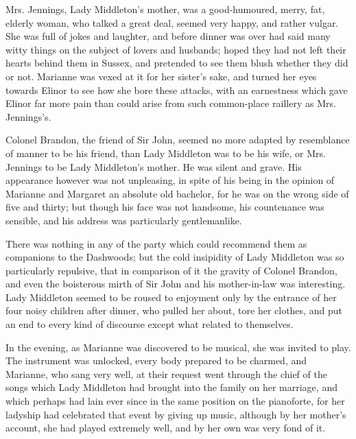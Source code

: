 Mrs. Jennings, Lady Middleton's mother, was a good-humoured, merry, fat, elderly woman, who talked a great deal, seemed very happy, and rather vulgar. She was full of jokes and laughter, and before dinner was over had said many witty things on the subject of lovers and husbands; hoped they had not left their hearts behind them in Sussex, and pretended to see them blush whether they did or not. Marianne was vexed at it for her sister's sake, and turned her eyes towards Elinor to see how she bore these attacks, with an earnestness which gave Elinor far more pain than could arise from such common-place raillery as Mrs. Jennings's.

Colonel Brandon, the friend of Sir John, seemed no more adapted by resemblance of manner to be his friend, than Lady Middleton was to be his wife, or Mrs. Jennings to be Lady Middleton's mother. He was silent and grave. His appearance however was not unpleasing, in spite of his being in the opinion of Marianne and Margaret an absolute old bachelor, for he was on the wrong side of five and thirty; but though his face was not handsome, his countenance was sensible, and his address was particularly gentlemanlike.

There was nothing in any of the party which could recommend them as companions to the Dashwoods; but the cold insipidity of Lady Middleton was so particularly repulsive, that in comparison of it the gravity of Colonel Brandon, and even the boisterous mirth of Sir John and his mother-in-law was interesting. Lady Middleton seemed to be roused to enjoyment only by the entrance of her four noisy children after dinner, who pulled her about, tore her clothes, and put an end to every kind of discourse except what related to themselves.

In the evening, as Marianne was discovered to be musical, she was invited to play. The instrument was unlocked, every body prepared to be charmed, and Marianne, who sang very well, at their request went through the chief of the songs which Lady Middleton had brought into the family on her marriage, and which perhaps had lain ever since in the same position on the pianoforte, for her ladyship had celebrated that event by giving up music, although by her mother's account, she had played extremely well, and by her own was very fond of it.

